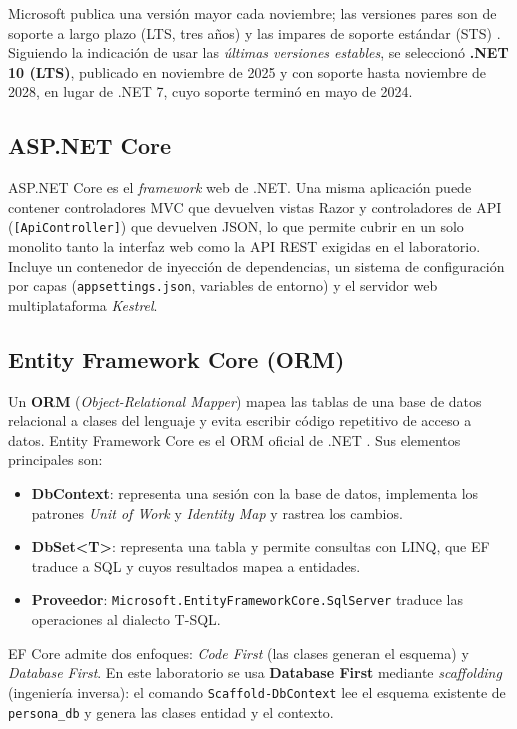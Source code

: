 \documentclass[12pt,letterpaper]{article}
\begin{document}
Microsoft publica una versión mayor cada noviembre; las versiones pares son de soporte a
largo plazo (LTS, tres años) y las impares de soporte estándar (STS) \cite{dotnetpolicy}.
Siguiendo la indicación de usar las \emph{últimas versiones estables}, se seleccionó
\textbf{.NET 10 (LTS)}, publicado en noviembre de 2025 y con soporte hasta noviembre de
2028, en lugar de .NET 7, cuyo soporte terminó en mayo de 2024.

\subsection{ASP.NET Core}
ASP.NET Core es el \emph{framework} web de .NET. Una misma aplicación puede contener
controladores MVC que devuelven vistas Razor y controladores de API
(\texttt{[ApiController]}) que devuelven JSON, lo que permite cubrir en un solo
monolito tanto la interfaz web como la API REST exigidas en el laboratorio. Incluye un
contenedor de inyección de dependencias, un sistema de configuración por capas
(\texttt{appsettings.json}, variables de entorno) y el servidor web multiplataforma
\emph{Kestrel}.

\subsection{Entity Framework Core (ORM)}
Un \textbf{ORM} (\emph{Object-Relational Mapper}) mapea las tablas de una base de datos
relacional a clases del lenguaje y evita escribir código repetitivo de acceso a datos.
Entity Framework Core es el ORM oficial de .NET \cite{efcore}. Sus elementos principales son:

\begin{itemize}[itemsep=2pt]
  \item \textbf{DbContext}: representa una sesión con la base de datos, implementa los
        patrones \emph{Unit of Work} y \emph{Identity Map} y rastrea los cambios.
  \item \textbf{DbSet<T>}: representa una tabla y permite consultas con LINQ, que EF
        traduce a SQL y cuyos resultados mapea a entidades.
  \item \textbf{Proveedor}: \texttt{Microsoft.EntityFrameworkCore.SqlServer} traduce las
        operaciones al dialecto T-SQL.
\end{itemize}

EF Core admite dos enfoques: \emph{Code First} (las clases generan el esquema) y
\emph{Database First}. En este laboratorio se usa \textbf{Database First} mediante
\emph{scaffolding} (ingeniería inversa): el comando \texttt{Scaffold-DbContext} lee el
esquema existente de \texttt{persona\_db} y genera las clases entidad y el contexto.
\end{document}
